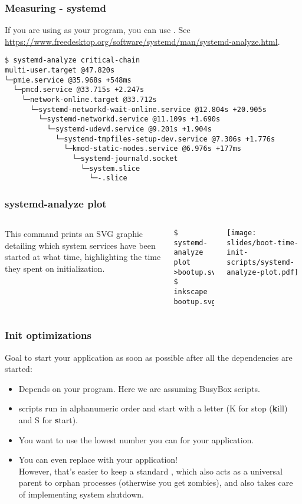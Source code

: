 \begin{frame}[fragile]
\frametitle{Measuring - systemd}
If you are using  as your  program, you can use
. See
\url{https://www.freedesktop.org/software/systemd/man/systemd-analyze.html}.\\
\begin{block}{}
\tiny
\begin{verbatim}
$ systemd-analyze critical-chain
multi-user.target @47.820s
└─pmie.service @35.968s +548ms
  └─pmcd.service @33.715s +2.247s
    └─network-online.target @33.712s
      └─systemd-networkd-wait-online.service @12.804s +20.905s
        └─systemd-networkd.service @11.109s +1.690s
          └─systemd-udevd.service @9.201s +1.904s
            └─systemd-tmpfiles-setup-dev.service @7.306s +1.776s
              └─kmod-static-nodes.service @6.976s +177ms
                └─systemd-journald.socket
                  └─system.slice
                    └─-.slice
\end{verbatim}
\end{block}
\end{frame}

\begin{frame}[fragile]
\frametitle{systemd-analyze plot}
\begin{columns}
This command prints an SVG graphic detailing which system services have been started at what time,
highlighting the time they spent on initialization.
\begin{verbatim}
$ systemd-analyze plot >bootup.svg
$ inkscape bootup.svg
\end{verbatim}
\texttt{[image: slides/boot-time-init-scripts/systemd-analyze-plot.pdf]}
\end{columns}
\end{frame}


\begin{frame}
\frametitle{Init optimizations}
Goal to start your application as soon as possible after all the dependencies are started:
\begin{itemize}
        \item Depends on your  program. Here we are assuming BusyBox
               scripts.
        \item {} scripts run in alphanumeric order and start with
              a letter (K for stop ({\bf k}ill) and S for {\bf s}tart).
        \item You want to use the lowest number you can for your application.
        \item You can even replace  with your application!\\
              However, that's easier to keep a standard , which also
              acts as a universal parent to orphan processes (otherwise
              you get zombies), and also takes care of implementing system shutdown.
\end{itemize}
\end{frame}

